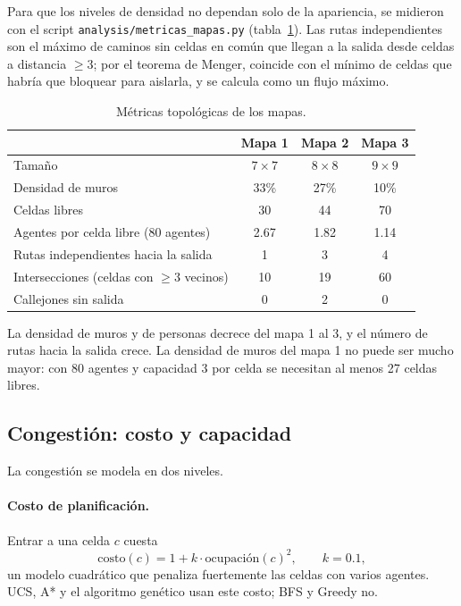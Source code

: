 \documentclass[11pt,a4paper]{article}
\begin{document}
Para que los niveles de densidad no dependan solo de la apariencia, se midieron con el script \texttt{analysis/metricas\_mapas.py} (tabla~\ref{tab:mapas}). Las rutas independientes son el máximo de caminos sin celdas en común que llegan a la salida desde celdas a distancia $\geq 3$; por el teorema de Menger, coincide con el mínimo de celdas que habría que bloquear para aislarla, y se calcula como un flujo máximo.

\begin{table}[H]
\centering
\caption{Métricas topológicas de los mapas.}
\label{tab:mapas}
\begin{tabular}{lccc}
\toprule
 & Mapa 1 & Mapa 2 & Mapa 3 \\
\midrule
Tamaño & $7\times7$ & $8\times8$ & $9\times9$ \\
Densidad de muros & 33\% & 27\% & 10\% \\
Celdas libres & 30 & 44 & 70 \\
Agentes por celda libre (80 agentes) & 2.67 & 1.82 & 1.14 \\
Rutas independientes hacia la salida & 1 & 3 & 4 \\
Intersecciones (celdas con $\geq 3$ vecinos) & 10 & 19 & 60 \\
Callejones sin salida & 0 & 2 & 0 \\
\bottomrule
\end{tabular}
\end{table}

La densidad de muros y de personas decrece del mapa 1 al 3, y el número de rutas hacia la salida crece. La densidad de muros del mapa 1 no puede ser mucho mayor: con 80 agentes y capacidad 3 por celda se necesitan al menos 27 celdas libres.

\subsection{Congestión: costo y capacidad}

La congestión se modela en dos niveles.

\paragraph{Costo de planificación.} Entrar a una celda $c$ cuesta
\begin{equation}
  \text{costo}(c) = 1 + k \cdot \text{ocupación}(c)^2, \qquad k = 0.1,
\end{equation}
un modelo cuadrático que penaliza fuertemente las celdas con varios agentes. UCS, A* y el algoritmo genético usan este costo; BFS y Greedy no.
\end{document}
